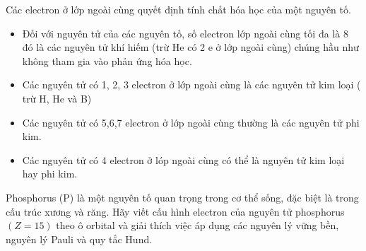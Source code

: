 \documentclass[Main.tex]{subfiles}
\begin{document}
	\begin{pp}
		Các electron ở lớp ngoài cùng quyết định tính chất hóa học của một nguyên tố.
		\begin{itemize}
			\item Đối với nguyên tử của các nguyên tố, số electron lớp ngoài cùng tối đa là 8 đó là các nguyên tử khí hiếm (trừ He có 2 e ở lớp ngoài cùng) chúng hầu như không tham gia vào phản ứng hóa học.
			\item Các nguyên tử có 1, 2, 3 electron ở lớp ngoài cùng là các nguyên tử kim loại ( trừ H, He và B)
			\item Các nguyên tử có 5,6,7 electron ở lớp ngoài cùng thường là các nguyên tử phi kim.
			\item Các nguyên tử có 4 electron  ở lóp ngoài cùng  có thể là nguyên tử kim loại hay phi kim.
		\end{itemize}
	\end{pp}
\begin{vdex}
	Phosphorus (P) là một nguyên tố quan trọng trong cơ thể sống, đặc biệt là trong cấu trúc xương và răng. Hãy viết cấu hình electron của nguyên tử phosphorus $(Z=15)$ theo ô orbital và giải thích việc áp dụng các nguyên lý vững bền, nguyên lý Pauli và quy tắc Hund.
\end{vdex}
\end{document}
